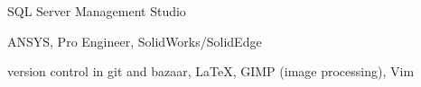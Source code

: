 \documentclass[]{deedy-resume-openfont}
\begin{document}
\begin{minipage}[t]{0.33\textwidth}
SQL Server Management Studio
\sectionsep

ANSYS, Pro Engineer, SolidWorks/SolidEdge
\sectionsep

version control in git and bazaar, \LaTeX, GIMP (image processing), Vim




\sectionsep

%
%

\end{minipage}
\hfill
\end{document}
